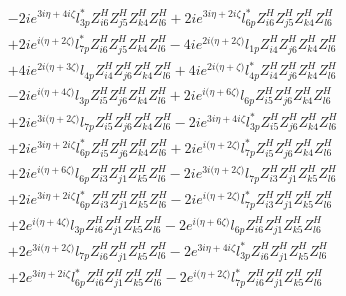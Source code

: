\begin{align}
 &-2 i e^{3 i \eta +4 i \zeta } l_{3p}^* Z_{{i 6}}^{H} Z_{{j 5}}^{H} Z_{{k 4}}^{H} Z_{{l 6}}^{H} +2 i e^{3 i \eta +2 i \zeta } l_{6p}^* Z_{{i 6}}^{H} Z_{{j 5}}^{H} Z_{{k 4}}^{H} Z_{{l 6}}^{H} \nonumber \\ 
 &+2 i e^{i \Big(\eta +2 \zeta \Big)} l_{7p}^* Z_{{i 6}}^{H} Z_{{j 5}}^{H} Z_{{k 4}}^{H} Z_{{l 6}}^{H} -4 i e^{2 i \Big(\eta +2 \zeta \Big)} l_{1p} Z_{{i 4}}^{H} Z_{{j 6}}^{H} Z_{{k 4}}^{H} Z_{{l 6}}^{H} \nonumber \\ 
 &+4 i e^{2 i \Big(\eta +3 \zeta \Big)} l_{4p} Z_{{i 4}}^{H} Z_{{j 6}}^{H} Z_{{k 4}}^{H} Z_{{l 6}}^{H} +4 i e^{2 i \Big(\eta +\zeta \Big)} l_{4p}^* Z_{{i 4}}^{H} Z_{{j 6}}^{H} Z_{{k 4}}^{H} Z_{{l 6}}^{H} \nonumber \\ 
 &-2 i e^{i \Big(\eta +4 \zeta \Big)} l_{3p} Z_{{i 5}}^{H} Z_{{j 6}}^{H} Z_{{k 4}}^{H} Z_{{l 6}}^{H} +2 i e^{i \Big(\eta +6 \zeta \Big)} l_{6p} Z_{{i 5}}^{H} Z_{{j 6}}^{H} Z_{{k 4}}^{H} Z_{{l 6}}^{H} \nonumber \\ 
 &+2 i e^{3 i \Big(\eta +2 \zeta \Big)} l_{7p} Z_{{i 5}}^{H} Z_{{j 6}}^{H} Z_{{k 4}}^{H} Z_{{l 6}}^{H} -2 i e^{3 i \eta +4 i \zeta } l_{3p}^* Z_{{i 5}}^{H} Z_{{j 6}}^{H} Z_{{k 4}}^{H} Z_{{l 6}}^{H} \nonumber \\ 
 &+2 i e^{3 i \eta +2 i \zeta } l_{6p}^* Z_{{i 5}}^{H} Z_{{j 6}}^{H} Z_{{k 4}}^{H} Z_{{l 6}}^{H} +2 i e^{i \Big(\eta +2 \zeta \Big)} l_{7p}^* Z_{{i 5}}^{H} Z_{{j 6}}^{H} Z_{{k 4}}^{H} Z_{{l 6}}^{H} \nonumber \\ 
 &+2 i e^{i \Big(\eta +6 \zeta \Big)} l_{6p} Z_{{i 3}}^{H} Z_{{j 1}}^{H} Z_{{k 5}}^{H} Z_{{l 6}}^{H} -2 i e^{3 i \Big(\eta +2 \zeta \Big)} l_{7p} Z_{{i 3}}^{H} Z_{{j 1}}^{H} Z_{{k 5}}^{H} Z_{{l 6}}^{H} \nonumber \\ 
 &+2 i e^{3 i \eta +2 i \zeta } l_{6p}^* Z_{{i 3}}^{H} Z_{{j 1}}^{H} Z_{{k 5}}^{H} Z_{{l 6}}^{H} -2 i e^{i \Big(\eta +2 \zeta \Big)} l_{7p}^* Z_{{i 3}}^{H} Z_{{j 1}}^{H} Z_{{k 5}}^{H} Z_{{l 6}}^{H} \nonumber \\ 
 &+2 e^{i \Big(\eta +4 \zeta \Big)} l_{3p} Z_{{i 6}}^{H} Z_{{j 1}}^{H} Z_{{k 5}}^{H} Z_{{l 6}}^{H} -2 e^{i \Big(\eta +6 \zeta \Big)} l_{6p} Z_{{i 6}}^{H} Z_{{j 1}}^{H} Z_{{k 5}}^{H} Z_{{l 6}}^{H} \nonumber \\ 
 &+2 e^{3 i \Big(\eta +2 \zeta \Big)} l_{7p} Z_{{i 6}}^{H} Z_{{j 1}}^{H} Z_{{k 5}}^{H} Z_{{l 6}}^{H} -2 e^{3 i \eta +4 i \zeta } l_{3p}^* Z_{{i 6}}^{H} Z_{{j 1}}^{H} Z_{{k 5}}^{H} Z_{{l 6}}^{H} \nonumber \\ 
 &+2 e^{3 i \eta +2 i \zeta } l_{6p}^* Z_{{i 6}}^{H} Z_{{j 1}}^{H} Z_{{k 5}}^{H} Z_{{l 6}}^{H} -2 e^{i \Big(\eta +2 \zeta \Big)} l_{7p}^* Z_{{i 6}}^{H} Z_{{j 1}}^{H} Z_{{k 5}}^{H} Z_{{l 6}}^{H} \nonumber \\ 

\end{align}
